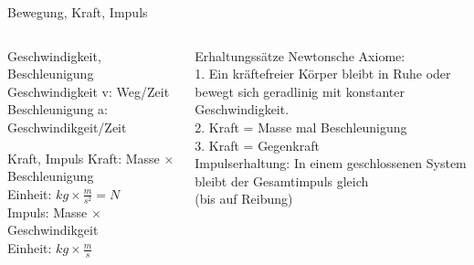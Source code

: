 \documentclass{beamer}
\begin{document}
\begin{frame}{Bewegung, Kraft, Impuls}
    
\begin{columns}[c]



\begin{column}{6cm}
    \begin{block}{Geschwindigkeit, Beschleunigung}
    Geschwindigkeit v: Weg/Zeit \\  



    \pause
    Beschleunigung a: Geschwindikgeit/Zeit
        \end{block}

\pause

\begin{block}{Kraft, Impuls}
Kraft: Masse \(\times\) Beschleunigung \\
Einheit: \( kg\times\frac{m}{s^2} = N \) \\[0.2cm]
\pause
Impuls: Masse \(\times\) Geschwindikgeit \\
Einheit: \( kg\times\frac{m}{s} \)


\end{block}




\end{column}

\begin{column}{5cm}


\begin{block}{Erhaltungssätze}
Newtonsche Axiome: \\
1. Ein kräftefreier Körper bleibt in Ruhe oder bewegt sich geradlinig mit konstanter Geschwindigkeit. \\
2. Kraft = Masse mal Beschleunigung \\
3. Kraft = Gegenkraft \\[0.2 cm]
\pause
Impulserhaltung: In einem geschlossenen System bleibt der Gesamtimpuls gleich \\(bis auf Reibung)


\end{block}



\end{column}


\end{columns}

    
    
    
\end{frame}
\end{document}
